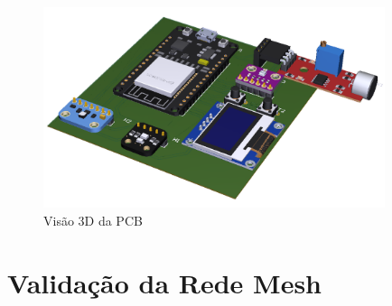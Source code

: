 \documentclass[../monografia.tex]{subfiles}
\begin{document}
\begin{figure}
\centering
\includegraphics[width=10cm]{pcb}
\caption{Visão 3D da PCB}
\label{fig:img4}
\end{figure}

\section{Validação da Rede Mesh}
\end{document}
